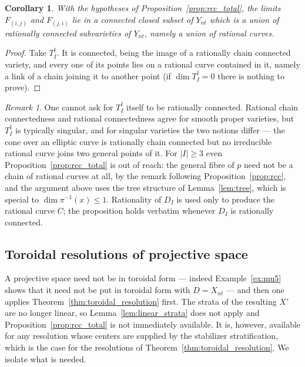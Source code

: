 \documentclass[11pt]{amsart}
\theoremstyle{plain}
\newtheorem{corollary}[theorem]{Corollary}
\theoremstyle{definition}
\theoremstyle{remark}
\newtheorem{remark}[theorem]{Remark}
\numberwithin{equation}{section}
\begin{document}
\begin{corollary} \label{cor:union_of_rc}
With the hypotheses of Proposition~\ref{prop:rcc_total}, the limits
$F_{(i,j)}$ and $F_{(j,i)}$ lie in a connected closed subset of $Y_{nt}$
which is a union of rationally connected subvarieties of $Y_{nt}$, namely
a union of rational curves.
\end{corollary}

\begin{proof}
Take $T_I^\dagger$.  It is connected, being the image of a rationally chain
connected variety, and every one of its points lies on a rational curve
contained in it, namely a link of a chain joining it to another point (if
$\dim T_I^\dagger = 0$ there is nothing to prove).
\end{proof}

\begin{remark}
One cannot ask for $T_I^\dagger$ itself to be rationally connected.
Rational chain connectedness and rational connectedness agree for smooth
proper varieties, but $T_I^\dagger$ is typically singular, and for singular
varieties the two notions differ --- the cone over an elliptic curve is
rationally chain connected but no irreducible rational curve joins two
general points of it.  For $|I| \geq 3$ even
Proposition~\ref{prop:rcc_total} is out of reach: the general fibre of $p$
need not be a chain of rational curves at all, by the remark following
Proposition~\ref{prop:rcc}, and the argument above uses the tree structure
of Lemma~\ref{lem:tree}, which is special to $\dim \pi^{-1}(x) \leq 1$.
Rationality of $D_I$ is used only to produce the rational curve $C$; the
proposition holds verbatim whenever $D_I$ is rationally connected.
\end{remark}

\subsection*{Toroidal resolutions of projective space}

A projective space need not be in toroidal form --- indeed
Example~\ref{ex:mu5} shows that it need not be put in toroidal form with
$D = X_{nt}$ --- and then one applies
Theorem~\ref{thm:toroidal_resolution} first.  The strata of the resulting
$X'$ are no longer linear, so Lemma~\ref{lem:linear_strata} does not apply
and Proposition~\ref{prop:rcc_total} is not immediately available.  It is,
however, available for any resolution whose centers are supplied by the
stabilizer stratification, which is the case for the resolutions of
Theorem~\ref{thm:toroidal_resolution}.  We isolate what is needed.
\end{document}
